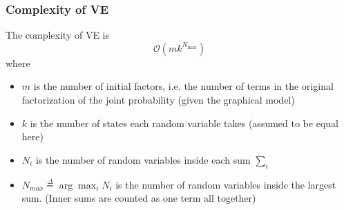 \documentclass[11pt]{article}
\newcommand{\argmax}{\arg\max}
\begin{document}
\subsubsection{Complexity of VE}
The complexity of VE is 
\begin{equation*}
    \mathcal{O}\left(m k^{N_{\max }}\right)
\end{equation*}
where
\begin{itemize}
    \item $m$ is the number of initial factors, i.e. the number of terms in the original factorization of the joint probability (given the graphical model)
    \item $k$ is the number of states each random variable takes (assumed to be equal here)
    \item $N_i$ is the number of random variables inside each sum $\sum_i$
    \item $N_{max} \overset{\Delta}{=}\argmax_i N_i$ is the number of random variables inside the largest sum. (Inner sums are counted as one term all together)
\end{itemize}
\end{document}
